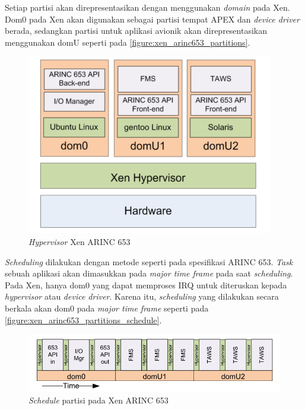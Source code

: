 Setiap partisi akan direpresentasikan dengan menggunakan \textit{domain} pada Xen.
Dom0 pada Xen akan digunakan sebagai partisi tempat APEX dan \textit{device driver} berada, sedangkan partisi untuk aplikasi avionik akan direpresentasikan menggunakan domU seperti pada \autoref{figure:xen_arinc653_partitions}.

\begin{figure}[htbp]
    \centering
    \includegraphics[scale=0.6]{resources/xen-arinc653-partitions.png}
    \caption{\textit{Hypervisor} Xen ARINC 653}
    \label{figure:xen_arinc653_partitions}
\end{figure}

\textit{Scheduling} dilakukan dengan metode seperti pada spesifikasi ARINC 653.
\textit{Task} sebuah aplikasi akan dimasukkan pada \textit{major time frame} pada saat \textit{scheduling}.
Pada Xen, hanya dom0 yang dapat memproses IRQ untuk diteruskan kepada \textit{hypervisor} atau \textit{device driver}.
Karena itu, \textit{scheduling} yang dilakukan secara berkala akan dom0 pada \textit{major time frame} seperti pada \autoref{figure:xen_arinc653_partitions_schedule}.

\begin{figure}[htbp]
    \includegraphics[scale=0.6]{resources/xen-arinc653-partition-schedule.png}
    \caption{\textit{Schedule} partisi pada Xen ARINC 653}
    \label{figure:xen_arinc653_partitions_schedule}
\end{figure}

